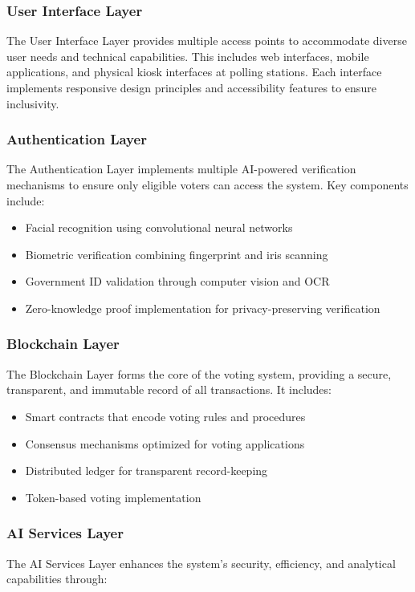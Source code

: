 \documentclass[conference]{IEEEtran}
\begin{document}
\subsubsection{User Interface Layer}
The User Interface Layer provides multiple access points to accommodate diverse user needs and technical capabilities. This includes web interfaces, mobile applications, and physical kiosk interfaces at polling stations. Each interface implements responsive design principles and accessibility features to ensure inclusivity.

\subsubsection{Authentication Layer}
The Authentication Layer implements multiple AI-powered verification mechanisms to ensure only eligible voters can access the system. Key components include:

\begin{itemize}
    \item Facial recognition using convolutional neural networks
    \item Biometric verification combining fingerprint and iris scanning
    \item Government ID validation through computer vision and OCR
    \item Zero-knowledge proof implementation for privacy-preserving verification
\end{itemize}

\subsubsection{Blockchain Layer}
The Blockchain Layer forms the core of the voting system, providing a secure, transparent, and immutable record of all transactions. It includes:

\begin{itemize}
    \item Smart contracts that encode voting rules and procedures
    \item Consensus mechanisms optimized for voting applications
    \item Distributed ledger for transparent record-keeping
    \item Token-based voting implementation
\end{itemize}

\subsubsection{AI Services Layer}
The AI Services Layer enhances the system's security, efficiency, and analytical capabilities through:
\end{document}
